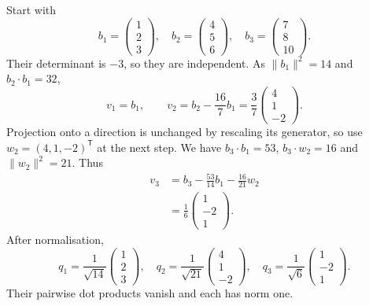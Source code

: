 \begin{example}
Start with
\[
 b_1=\begin{pmatrix}1\\2\\3\end{pmatrix},\quad
 b_2=\begin{pmatrix}4\\5\\6\end{pmatrix},\quad
 b_3=\begin{pmatrix}7\\8\\10\end{pmatrix}.
\]
Their determinant is $-3$, so they are independent.
As $\|b_1\|^2=14$ and $b_2\cdot b_1=32$,
\[
 v_1=b_1,\qquad
 v_2=b_2-\frac{16}{7}b_1
     =\frac37\begin{pmatrix}4\\1\\-2\end{pmatrix}.
\]
Projection onto a direction is unchanged by rescaling its generator,
so use $w_2=(4,1,-2)^{\mathsf T}$ at the next step.
We have $b_3\cdot b_1=53$, $b_3\cdot w_2=16$ and $\|w_2\|^2=21$.
Thus
\begin{align*}
 v_3&=b_3-\frac{53}{14}b_1-\frac{16}{21}w_2\\
 &=\frac16\begin{pmatrix}1\\-2\\1\end{pmatrix}.
\end{align*}
After normalisation,
\[
 \boxed{
 q_1=\frac1{\sqrt{14}}\begin{pmatrix}1\\2\\3\end{pmatrix},\quad
 q_2=\frac1{\sqrt{21}}\begin{pmatrix}4\\1\\-2\end{pmatrix},\quad
 q_3=\frac1{\sqrt6}\begin{pmatrix}1\\-2\\1\end{pmatrix}.}
\]
Their pairwise dot products vanish and each has norm one.
\end{example}


